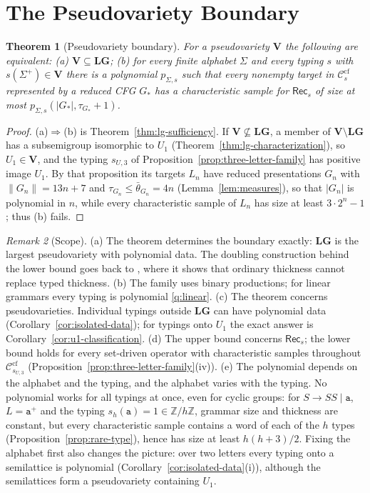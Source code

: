 \documentclass[11pt]{article}
\numberwithin{equation}{section}
\theoremstyle{plain}
\newtheorem{theorem}{Theorem}[section]
\theoremstyle{definition}
\theoremstyle{remark}
\newtheorem{remark}[theorem]{Remark}
\theoremstyle{plain}
\newcommand{\cf}{\mathrm{cf}}
\newcommand{\Ccf}[1]{\mathcal C_{#1}^{\cf}}
\newcommand{\Rec}{\mathsf{Rec}}
\newcommand{\LG}{\mathbf{LG}}
\begin{document}
\section{The Pseudovariety Boundary}
\label{sec:pseudovariety}

\begin{theorem}[Pseudovariety boundary]
\label{thm:pseudovariety-boundary}
For a pseudovariety $\mathbf V$ the following are equivalent:
\textup{(a)} $\mathbf V\subseteq\LG$;
\textup{(b)} for every finite alphabet $\Sigma$ and every typing $s$ with
$s(\Sigma^+)\in\mathbf V$ there is a polynomial $p_{\Sigma,s}$ such that every
nonempty target in $\Ccf{s}$ represented by a reduced CFG $G_*$ has a
characteristic sample for $\Rec_s$ of size at most
$p_{\Sigma,s}(|G_*|,\tau_{G_*}+1)$.
\end{theorem}

\begin{proof}
(a)$\Rightarrow$(b) is Theorem~\ref{thm:lg-sufficiency}.  If
$\mathbf V\not\subseteq\LG$, a member of $\mathbf V\setminus\LG$ has a
subsemigroup isomorphic to $U_1$ (Theorem~\ref{thm:lg-characterization}), so
$U_1\in\mathbf V$, and the typing $s_{U,3}$ of
Proposition~\ref{prop:three-letter-family} has positive image $U_1$.  By that
proposition its targets $L_n$ have reduced presentations $G_n$ with
$\|G_n\|=13n+7$ and $\tau_{G_n}\le\bar\theta_{G_n}=4n$
\textup(Lemma~\ref{lem:measures}\textup), so that $|G_n|$ is polynomial in $n$,
while every characteristic sample of $L_n$ has size at least $3\cdot2^n-1$;
thus (b) fails.
\end{proof}

\begin{remark}[Scope]
\label{rem:scope}
(a) The theorem determines the boundary exactly: $\LG$ is the largest
pseudovariety with polynomial data.  The doubling construction behind the
lower bound goes back to \cite[Proposition~6.4]{kuriyamaCFG}, where it shows
that ordinary thickness cannot replace typed thickness.
(b) The family uses binary productions; for linear grammars every typing is
polynomial \ref{q:linear}.
(c) The theorem concerns pseudovarieties.  Individual typings outside $\LG$
can have polynomial data (Corollary~\ref{cor:isolated-data}); for typings onto
$U_1$ the exact answer is Corollary~\ref{cor:u1-classification}.
(d) The upper bound concerns $\Rec_s$; the lower bound holds for every
set-driven operator with characteristic samples throughout $\Ccf{s_{U,3}}$
\textup(Proposition~\ref{prop:three-letter-family}(iv)\textup).
(e) The polynomial depends on the alphabet and the typing, and the alphabet
varies with the typing.  No polynomial works for all typings at once, even
for cyclic groups: for $S\to SS\mid\mathtt a$, $L=\mathtt a^+$ and the typing
$s_h(\mathtt a)=1\in\mathbb Z/h\mathbb Z$, grammar size and thickness are
constant, but every characteristic sample contains a word of each of the $h$
types (Proposition~\ref{prop:rare-type}), hence has size at least $h(h+3)/2$.
Fixing the alphabet first also changes the picture: over two letters every
typing onto a semilattice is polynomial (Corollary~\ref{cor:isolated-data}(i)),
although the semilattices form a pseudovariety containing $U_1$.
\end{remark}
\end{document}
